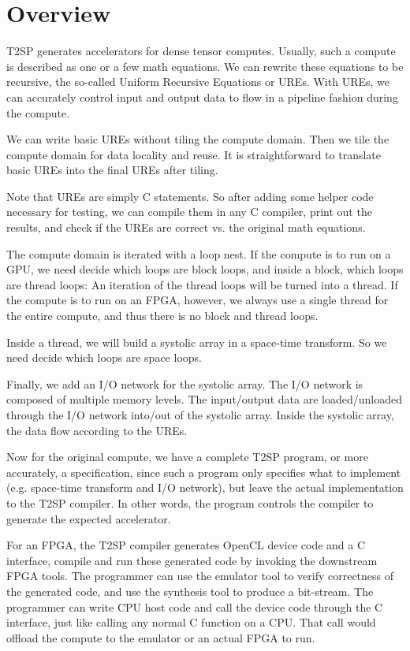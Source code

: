 \chapter{Overview}

T2SP generates accelerators for dense tensor computes. Usually, such a compute is described as one or a few math equations.  We can rewrite these equations to be recursive, the so-called Uniform Recursive Equations or UREs. With UREs, we can accurately control input and output data to flow in a pipeline fashion during the compute.

We can write basic UREs without tiling the compute domain. Then we tile the compute domain for data locality and reuse. It is straightforward to translate basic UREs into the final UREs after tiling.

Note that UREs are simply C statements. So after adding some helper code necessary for testing,  we can compile them in any C compiler, print out the results, and check if the UREs are correct vs. the original math equations.

The compute domain is iterated with a loop nest. If the compute is to run on a GPU, we need decide which loops are block loops, and inside a block, which loops are thread loops: An iteration of the thread loops will be turned into a thread. If the compute is to run on an FPGA, however, we always use a single thread for the entire compute, and thus there is no block and thread loops. 

Inside a thread, we will build a systolic array in a space-time transform. So we need decide which loops are space loops.  

Finally, we add an I/O network for the systolic array.  The I/O network is composed of multiple memory levels. The input/output data are loaded/unloaded through the I/O network into/out of the systolic array. Inside the systolic array, the data flow according to the UREs.  

Now for the original compute, we have a complete T2SP program, or more accurately, a specification, since such a program only specifies what to implement (e.g. space-time transform and I/O network), but leave the actual implementation to the T2SP compiler. In other words, the program controls the compiler to generate the expected accelerator. 

For an FPGA, the T2SP compiler generates OpenCL device code and a C interface, compile and run these generated code by invoking the downstream FPGA tools. The programmer can use the emulator tool to verify correctness of the generated code, and use the synthesis tool to produce a bit-stream.  The programmer can write CPU host code and call the device code through the C interface, just like calling any normal C function on a CPU. That call would offload the compute to the emulator or an actual FPGA to run.

